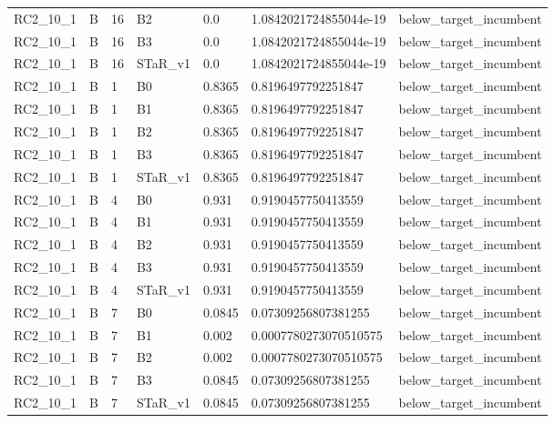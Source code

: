 \begin{tabular}{lllllll}
 RC2\_10\_1 & B & 16 & B2 & 0.0 & 1.0842021724855044e-19 & below\_target\_incumbent \\
 RC2\_10\_1 & B & 16 & B3 & 0.0 & 1.0842021724855044e-19 & below\_target\_incumbent \\
 RC2\_10\_1 & B & 16 & STaR\_v1 & 0.0 & 1.0842021724855044e-19 & below\_target\_incumbent \\
 RC2\_10\_1 & B & 1 & B0 & 0.8365 & 0.8196497792251847 & below\_target\_incumbent \\
 RC2\_10\_1 & B & 1 & B1 & 0.8365 & 0.8196497792251847 & below\_target\_incumbent \\
 RC2\_10\_1 & B & 1 & B2 & 0.8365 & 0.8196497792251847 & below\_target\_incumbent \\
 RC2\_10\_1 & B & 1 & B3 & 0.8365 & 0.8196497792251847 & below\_target\_incumbent \\
 RC2\_10\_1 & B & 1 & STaR\_v1 & 0.8365 & 0.8196497792251847 & below\_target\_incumbent \\
 RC2\_10\_1 & B & 4 & B0 & 0.931 & 0.9190457750413559 & below\_target\_incumbent \\
 RC2\_10\_1 & B & 4 & B1 & 0.931 & 0.9190457750413559 & below\_target\_incumbent \\
 RC2\_10\_1 & B & 4 & B2 & 0.931 & 0.9190457750413559 & below\_target\_incumbent \\
 RC2\_10\_1 & B & 4 & B3 & 0.931 & 0.9190457750413559 & below\_target\_incumbent \\
 RC2\_10\_1 & B & 4 & STaR\_v1 & 0.931 & 0.9190457750413559 & below\_target\_incumbent \\
 RC2\_10\_1 & B & 7 & B0 & 0.0845 & 0.07309256807381255 & below\_target\_incumbent \\
 RC2\_10\_1 & B & 7 & B1 & 0.002 & 0.0007780273070510575 & below\_target\_incumbent \\
 RC2\_10\_1 & B & 7 & B2 & 0.002 & 0.0007780273070510575 & below\_target\_incumbent \\
 RC2\_10\_1 & B & 7 & B3 & 0.0845 & 0.07309256807381255 & below\_target\_incumbent \\
 RC2\_10\_1 & B & 7 & STaR\_v1 & 0.0845 & 0.07309256807381255 & below\_target\_incumbent \\
 \hline
\end{tabular}
